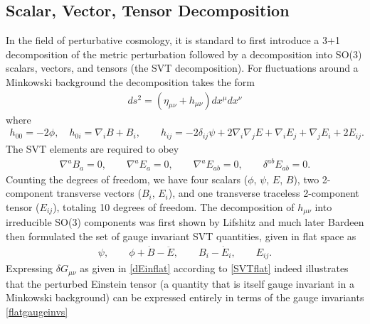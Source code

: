 \documentclass[10pt,letterpaper]{article}
\numberwithin{equation}{section}
\begin{document}
\subsection{Scalar, Vector, Tensor Decomposition}
\label{sec:Scalar, vector, Tensor Decomposition}
In the field of perturbative cosmology, it is standard to first introduce a 3+1 decomposition of the metric perturbation followed by a decomposition into SO(3) scalars, vectors, and tensors (the SVT decomposition)\cite{Ellis2012}. For fluctuations around a Minkowski background the decomposition takes the form
\begin{eqnarray}
ds^2 =  (\eta_{\mu\nu} + h_{\mu\nu})dx^\mu dx^\nu
\end{eqnarray}
where
\begin{eqnarray}
h_{00} = -2\phi,\quad h_{0i} = \nabla_i B + B_i,\qquad h_{ij} = -2\delta_{ij}\psi + 2\nabla_i\nabla_j E + \nabla_i E_j + \nabla_j E_i + 2 E_{ij}. 
\label{SVTflat}
\end{eqnarray}
The SVT elements are required to obey 
\begin{eqnarray}
\nabla^a B_a =0,\qquad \nabla^a E_a = 0,\qquad \nabla^a E_{ab} = 0,\qquad \delta^{ab}E_{ab} = 0.
\end{eqnarray}
Counting the degrees of freedom, we have four scalars ($\phi$, $\psi$, $E$, $B$), two 2-component transverse vectors ($B_i$, $E_i$), and one transverse traceless 2-component tensor ($E_{ij}$), totaling 10 degrees of freedom. The decomposition of $h_{\mu\nu}$ into irreducible SO(3) components was first shown by Lifshitz \cite{Lifshitz1946} and much later Bardeen \cite{Bardeen1980} then formulated the set of gauge invariant SVT quantities, given in flat space as
\begin{eqnarray}
\psi,\qquad \phi + \dot B-\ddot E,\qquad B_i-\dot E_i,\qquad E_{ij}. 
\label{flatgaugeinvs}
\end{eqnarray}
Expressing $\delta G_{\mu\nu}$ as given in \eqref{dEinflat} according to \eqref{SVTflat} indeed illustrates that the perturbed Einstein tensor (a quantity that is itself gauge invariant in a Minkowski background) can be expressed entirely in terms of the gauge invariants \eqref{flatgaugeinvs}
\end{document}
